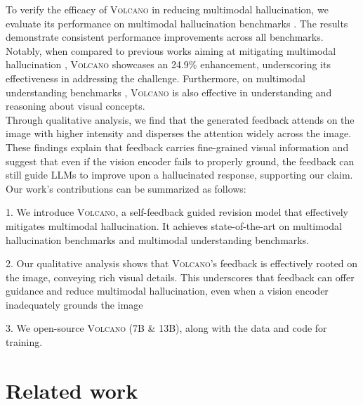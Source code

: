 \documentclass[11pt]{article}
\newcommand{\Ours}{\textsc{Volcano}}
\begin{document}
To verify the efficacy of {\Ours} in reducing multimodal hallucination, we evaluate its performance on multimodal hallucination benchmarks \citep{sun2023aligning, li2023evaluating, liu2023mitigating}. The results demonstrate consistent performance improvements across all benchmarks. Notably, when compared to previous works aiming at mitigating multimodal hallucination \citep{zhou2023analyzing, sun2023aligning, yin2023woodpecker}, {\Ours} showcases an 24.9\% enhancement, underscoring its effectiveness in addressing the challenge. Furthermore, on multimodal understanding benchmarks \citep{liu2023mmbench, yu2023mmvet}, {\Ours} is also effective in understanding and reasoning about visual concepts. \\
Through qualitative analysis, we find that the generated feedback attends on the image with higher intensity and disperses the attention widely across the image. These findings explain that feedback carries fine-grained visual information and suggest that even if the vision encoder fails to properly ground, the feedback can still guide LLMs to improve upon a hallucinated response, supporting our claim. \\
Our work's contributions can be summarized as follows:
\begin{description}
\item 1. We introduce {\Ours}, a self-feedback guided revision model that effectively mitigates multimodal hallucination. It achieves state-of-the-art on multimodal hallucination benchmarks and multimodal understanding benchmarks.
\item 2. Our qualitative analysis shows that {\Ours}'s feedback is effectively rooted on the image, conveying rich visual details. This underscores that feedback can offer guidance and reduce multimodal hallucination, even when a vision encoder inadequately grounds the image
\item 3. We open-source {\Ours} (7B \& 13B), along with the data and code for training.
\end{description}
\section{Related work}
\label{sec:related}
\end{document}
